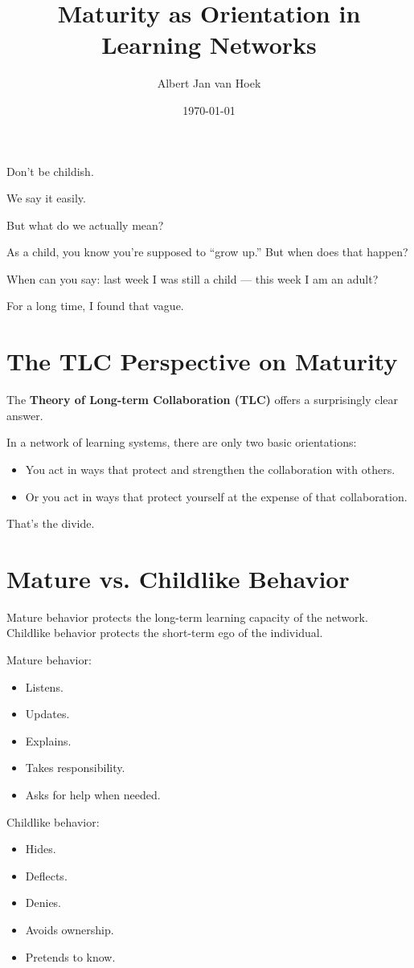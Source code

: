 \documentclass{article}
\title{Maturity as Orientation in Learning Networks}
\author{Albert Jan van Hoek}
\date{\today}
\begin{document}
\maketitle

Don’t be childish.

We say it easily.

But what do we actually mean?

As a child, you know you’re supposed to ``grow up.''
But when does that happen?

When can you say: last week I was still a child — this week I am an adult?

For a long time, I found that vague.

\section*{The TLC Perspective on Maturity}

The \textbf{Theory of Long-term Collaboration (TLC)} offers a surprisingly clear answer.

In a network of learning systems, there are only two basic orientations:
\begin{itemize}
    \item You act in ways that protect and strengthen the collaboration with others.
    \item Or you act in ways that protect yourself at the expense of that collaboration.
\end{itemize}
That’s the divide.

\section*{Mature vs. Childlike Behavior}

Mature behavior protects the long-term learning capacity of the network.
Childlike behavior protects the short-term ego of the individual.

Mature behavior:
\begin{itemize}
    \item Listens.
    \item Updates.
    \item Explains.
    \item Takes responsibility.
    \item Asks for help when needed.
\end{itemize}

Childlike behavior:
\begin{itemize}
    \item Hides.
    \item Deflects.
    \item Denies.
    \item Avoids ownership.
    \item Pretends to know.
\end{itemize}
\end{document}
